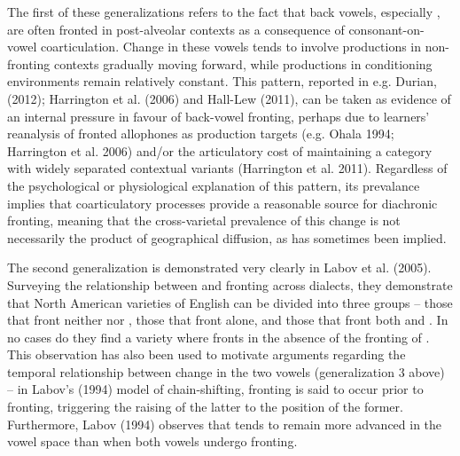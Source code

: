 \documentclass[12pt]{article}
\begin{document}
The first of these generalizations refers to the fact that back vowels, especially , are often fronted in post-alveolar contexts as a consequence of consonant-on-vowel coarticulation. Change in these vowels tends to involve productions in non-fronting contexts gradually moving forward, while productions in conditioning environments remain relatively constant. This pattern, reported in e.g. Durian, (2012); Harrington et al. (2006) and Hall-Lew (2011), can be taken as evidence of an internal pressure in favour of back-vowel fronting, perhaps due to learners' reanalysis of fronted allophones as production targets (e.g. Ohala 1994; Harrington et al. 2006) and/or the articulatory cost of maintaining a category with widely separated contextual variants (Harrington et al. 2011). Regardless of the psychological or physiological explanation of this pattern, its prevalance implies that coarticulatory processes provide a reasonable source for diachronic fronting, meaning that the cross-varietal prevalence of this change is not necessarily the product of geographical diffusion, as has sometimes been implied.

The second generalization is demonstrated very clearly in Labov et al. (2005).   Surveying the relationship between  and  fronting across dialects, they demonstrate that North American varieties of English can be divided into three groups -- those that front neither  nor , those that front  alone, and those that front both  and . In no cases do they find a variety where  fronts in the absence of the fronting of . This observation has also been used to motivate arguments regarding the temporal relationship between change in the two vowels (generalization 3 above) -- in Labov's (1994) model of chain-shifting,  fronting is said to occur prior to  fronting, triggering the raising of the latter to the position of the former. Furthermore, Labov (1994) observes that  tends to remain more advanced in the vowel space than  when both vowels undergo fronting. 
\end{document}
